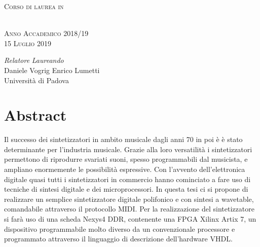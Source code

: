 \documentclass[italian,11pt,a4paper,twoside,openright]{book}
\begin{document}
\begin{center}
	\vspace{5pt}
	\scshape{Corso di laurea in}
	\@mastername
	
	
	\vspace{40pt}
	\scshape{\LARGE{\bfseries{\textcolor{SchoolColor}{\thetitle}}}} \normalsize \\
	\vspace{25pt}
	\vspace{15pt}
	\scshape{Anno Accademico 2018/19} \\
	\scshape{15 Luglio 2019}
	
	\vfill
	\begin{normalsize}
		\begin{flushleft}
			\textit{Relatore} \hfill \textit{Laureando}\\
			\vspace{1pt}
			Daniele Vogrig \hfill Enrico Lumetti\\
			Università di Padova \\
			\vspace{6pt}
			
		\end{flushleft}
	\end{normalsize}
	
\end{center}
\vspace*{\fill}
\singlespacing
{} 
\cleardoublepage

\chapter*{Abstract}
Il successo dei sintetizzatori in ambito musicale dagli anni 70 in poi è
è stato determinante per l'industria musicale. Grazie alla loro versatilità
i sintetizzatori permettono di riprodurre svariati suoni, spesso
programmabili dal musicista, e ampliano enormemente le possibilità espressive.
Con l'avvento dell'elettronica digitale quasi tutti i sintetizzatori in
commercio hanno cominciato a fare uso di tecniche di sintesi digitale e
dei microprocessori.
In questa tesi ci si propone di realizzare un semplice sintetizzatore 
digitale polifonico e con sintesi a wavetable, comandabile attraverso
il protocollo MIDI.
Per la realizzazione del sintetizzatore si farà uso di una scheda
Nexys4 DDR, contenente una FPGA Xilinx Artix 7, un dispositivo programmabile
molto diverso da un convenzionale processore e programmato attraverso
il linguaggio di descrizione dell'hardware VHDL.

\tableofcontents
\mainmatter
\pagestyle{plain}








\backmatter
\end{document}
